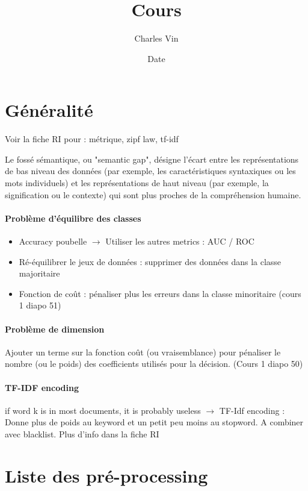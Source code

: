 \documentclass{article}
\title{Cours}
\author{Charles Vin}
\date{Date}
\theoremstyle{plain}%
\theoremstyle{definition}
\theoremstyle{remark}
\begin{document}
\maketitle

\section{Généralité}
Voir la fiche RI pour : métrique, zipf law, tf-idf

Le fossé sémantique, ou "semantic gap", désigne l'écart entre les représentations de bas niveau des données (par exemple, les caractéristiques syntaxiques ou les mots individuels) et les représentations de haut niveau (par exemple, la signification ou le contexte) qui sont plus proches de la compréhension humaine. 

\paragraph*{Problème d'équilibre des classes}
\begin{itemize}
    \item Accuracy poubelle $\rightarrow$ Utiliser les autres metrics : AUC / ROC
    \item Ré-équilibrer le jeux de données : supprimer des données dans la classe majoritaire 
    \item Fonction de coût : pénaliser plus les erreurs dans la classe minoritaire (cours 1 diapo 51)
\end{itemize}

\paragraph*{Problème de dimension}
Ajouter un terme sur la fonction coût (ou vraisemblance) pour pénaliser le nombre (ou le poids) des coefficients utilisés pour la décision. (Cours 1 diapo 50)

\paragraph*{TF-IDF encoding} if word k is in most documents, it is probably useless $\rightarrow$ TF-Idf encoding : Donne plus de poids au keyword et un petit peu moins au stopword. A combiner avec blacklist. Plus d'info dans la fiche RI

\section{Liste des pré-processing}
\end{document}

